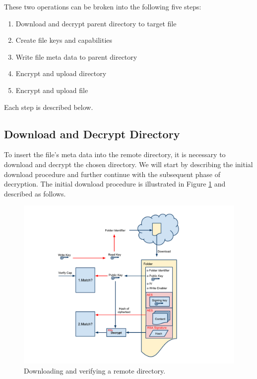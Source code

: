 \documentclass[english,12pt,a4paper]{book}
\begin{document}
These two operations can be broken into the following five steps:

\begin{enumerate}
\item Download and decrypt parent directory to target file
\item Create file keys and capabilities
\item Write file meta data to parent directory
\item Encrypt and upload directory
\item Encrypt and upload file
\end{enumerate}

Each step is described below.

\subsection{Download and Decrypt Directory}

To insert the file's meta data into the remote directory, it is necessary to
download and decrypt the chosen directory. We will start by describing the
initial download procedure and further continue with the subsequent phase of
decryption. The initial download procedure is illustrated in Figure
\ref{fig:CS:VOD} and described as follows.

\begin{figure}[h!]
    \centering
    \includegraphics[width=\columnwidth]{VerifyOpenFolder.pdf}
    \caption{Downloading and verifying a remote directory.}
    \label{fig:CS:VOD}
\end{figure}
\end{document}
